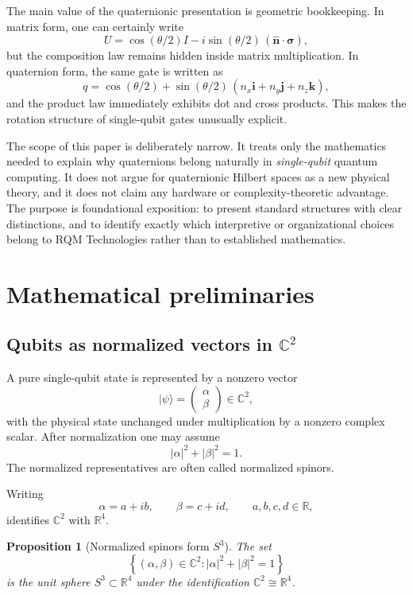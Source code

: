 \documentclass[11pt]{article}
\newtheorem{proposition}[definition]{Proposition}
\theoremstyle{remark}
\newcommand{\R}{\mathbb{R}}
\newcommand{\C}{\mathbb{C}}
\newcommand{\ii}{\mathbf{i}}
\newcommand{\jj}{\mathbf{j}}
\newcommand{\kk}{\mathbf{k}}
\newcommand{\Id}{I}
\newcommand{\abs}[1]{\left\lvert #1 \right\rvert}
\newcommand{\set}[1]{\left\{ #1 \right\}}
\newcommand{\ket}[1]{\lvert #1 \rangle}
\newcommand{\bloch}[1]{\bm{#1}}
\begin{document}
The main value of the quaternionic presentation is geometric bookkeeping. In matrix form, one can certainly write
\[
U = \cos(\theta/2)\Id - i \sin(\theta/2)\,(\hat{\bloch{n}}\cdot\bm{\sigma}),
\]
but the composition law remains hidden inside matrix multiplication. In quaternion form, the same gate is written as
\[
q = \cos(\theta/2) + \sin(\theta/2)\,(n_x \ii + n_y \jj + n_z \kk),
\]
and the product law immediately exhibits dot and cross products. This makes the rotation structure of single-qubit gates unusually explicit.

The scope of this paper is deliberately narrow. It treats only the mathematics needed to explain why quaternions belong naturally in \emph{single-qubit} quantum computing. It does not argue for quaternionic Hilbert spaces as a new physical theory, and it does not claim any hardware or complexity-theoretic advantage. The purpose is foundational exposition: to present standard structures with clear distinctions, and to identify exactly which interpretive or organizational choices belong to RQM Technologies rather than to established mathematics.

\section{Mathematical preliminaries}

\subsection{Qubits as normalized vectors in \texorpdfstring{$\C^2$}{C2}}

A pure single-qubit state is represented by a nonzero vector
\[
\ket{\psi}=\begin{pmatrix}\alpha \\ \beta\end{pmatrix}\in \C^2,
\]
with the physical state unchanged under multiplication by a nonzero complex scalar. After normalization one may assume
\[
\abs{\alpha}^2+\abs{\beta}^2=1.
\]
The normalized representatives are often called normalized spinors.

Writing
\[
\alpha=a+ib,\qquad \beta=c+id,\qquad a,b,c,d\in\R,
\]
identifies $\C^2$ with $\R^4$.

\begin{proposition}[Normalized spinors form $S^3$]
The set
\[
\set{(\alpha,\beta)\in\C^2:\abs{\alpha}^2+\abs{\beta}^2=1}
\]
is the unit sphere $S^3\subset \R^4$ under the identification $\C^2\cong\R^4$.
\end{proposition}
\end{document}
